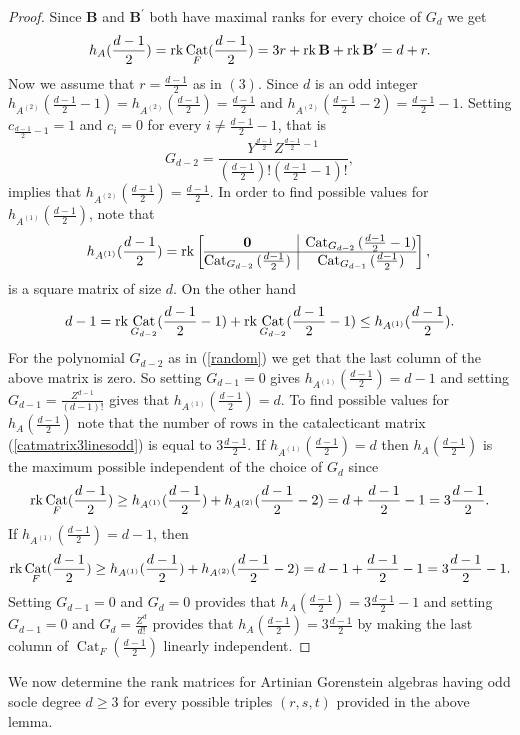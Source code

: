 \documentclass[12pt]{amsart}
\numberwithin{equation}{section}
\theoremstyle{plain} \newtheorem{theorem}{Theorem}[section]
\theoremstyle{definition} \newtheorem{definition}[theorem]{Definition}
\DeclareMathOperator{\Cat}{Cat}\DeclareMathOperator{\B}{\mathcal{B}}
\begin{document}
\begin{proof}
Since $\mathbf{B}$ and $\mathbf{B^\prime}$ both have maximal ranks for every choice of $G_d$ we get 
$$
h_A(\frac{d-1}{2})=\rk\Cat_{F}(\frac{d-1}{2}) = 3r+\rk\mathbf{B}+\rk\mathbf{B^\prime} = d+r.
$$
Now we assume that $r=\frac{d-1}{2}$ as in $(3)$. Since $d$ is an odd integer $h_{A^{(2)}}(\frac{d-1}{2}-1)=h_{A^{(2)}}(\frac{d-1}{2})=\frac{d-1}{2}$ and  $h_{A^{(2)}}(\frac{d-1}{2}-2) = \frac{d-1}{2}-1$. Setting $c_{\frac{d-1}{2}-1}=1$ and $c_i=0$ for every $i\neq \frac{d-1}{2}-1$, that is
\begin{equation}\label{random}
G_{d-2} = \frac{Y^{\frac{d-1}{2}}Z^{\frac{d-1}{2}-1}}{(\frac{d-1}{2})!(\frac{d-1}{2}-1)!},
\end{equation}
implies that $h_{A^{(2)}}(\frac{d-1}{2})=\frac{d-1}{2}$.
In order to find possible values for $h_{A^{(1)}}(\frac{d-1}{2})$, note that
\begin{equation*}
h_{A^{(1)}}(\frac{d-1}{2}) = \rk\left[\begin{array}{@{}c|c@{}}
 \mathbf{0}&{\Cat_{G_{d-2}}{(\frac{d-1}{2}-1)}}
\\\hline
\Cat_{G_{d-2}}{(\frac{d-1}{2})}&\Cat_{G_{d-1}}{(\frac{d-1}{2})}\\
\end{array}
\right],\\
\end{equation*}
is a square matrix of size $d$. On the other hand $$d-1=\rk\Cat_{G_{d-2}}(\frac{d-1}{2}-1)+\rk\Cat_{G_{d-2}}(\frac{d-1}{2}-1)\leq h_{A^{(1)}}(\frac{d-1}{2}).$$ 
For the polynomial $G_{d-2}$ as in (\ref{random}) we get that the last column of the above matrix is zero. So setting $G_{d-1}=0$ gives $h_{A^{(1)}}(\frac{d-1}{2})=d-1$ and setting $G_{d-1}=\frac{Z^{d-1}}{(d-1)!}$ gives that $h_{A^{(1)}}(\frac{d-1}{2})=d$.
To find possible values for $h_A(\frac{d-1}{2})$ note that the number of rows in the catalecticant matrix (\ref{catmatrix3linesodd}) is equal to  $3\frac{d-1}{2}$. 
If $h_{A^{(1)}}(\frac{d-1}{2})=d$ then  $h_A(\frac{d-1}{2})$ is the maximum possible independent of  the choice of $G_d$ since 
$$\rk\Cat_F(\frac{d-1}{2})\geq  h_{A^{(1)}}(\frac{d-1}{2})+h_{A^{(2)}}(\frac{d-1}{2}-2)=d+\frac{d-1}{2}-1=3\frac{d-1}{2}.$$
If $h_{A^{(1)}}(\frac{d-1}{2})=d-1$, then 
$$
\rk\Cat_F(\frac{d-1}{2})\geq  h_{A^{(1)}}(\frac{d-1}{2})+h_{A^{(2)}}(\frac{d-1}{2}-2)=d-1+\frac{d-1}{2}-1=3\frac{d-1}{2}-1.
$$ Setting $G_{d-1}=0$ and $G_{d}=0$ provides that 
$ h_{A}(\frac{d-1}{2})=3\frac{d-1}{2}-1$ and setting $G_{d-1}=0$ and $G_{d}=\frac{Z^d}{d!}$ provides that $ h_{A}(\frac{d-1}{2})=3\frac{d-1}{2}$ by making the last column of $\Cat_F(\frac{d-1}{2})$ linearly independent. 
\end{proof}
We now determine the rank matrices for Artinian Gorenstein algebras having odd socle degree $d\geq 3$ for every possible triples $(r,s,t)$ provided in the above lemma. 
\end{document}

